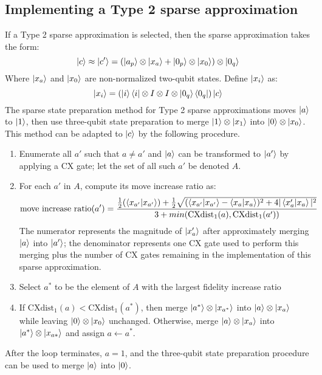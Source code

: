 \documentclass{article}
\begin{document}
\subsection{Implementing a Type 2 sparse approximation}
If a Type 2 sparse approximation is selected, then the sparse approximation
takes the form:
$$\mathinner{|{c}\rangle} \approx \mathinner{|{c'}\rangle} = (\mathinner{|{a_p}\rangle} \otimes \mathinner{|{x_a}\rangle} + 
  \mathinner{|{0_p}\rangle} \otimes \mathinner{|{x_0}\rangle}) \otimes \mathinner{|{0_q}\rangle}$$
Where $\mathinner{|{x_a}\rangle}$ and $\mathinner{|{x_0}\rangle}$ are non-normalized two-qubit states.
Define $\mathinner{|{x_i}\rangle}$ as:
$$\mathinner{|{x_i}\rangle} = (\mathinner{|{i}\rangle}\mathinner{\langle{i}|} \otimes I \otimes I \otimes \mathinner{|{0_q}\rangle}\mathinner{\langle{0_q}|})\mathinner{|{c}\rangle}$$ 
The sparse state preparation method for Type 2 sparse approximations moves 
$\mathinner{|{a}\rangle}$ to $\mathinner{|{1}\rangle}$, then use three-qubit state preparation to merge 
$\mathinner{|{1}\rangle} \otimes \mathinner{|{x_1}\rangle}$ into $\mathinner{|{0}\rangle} \otimes \mathinner{|{x_0}\rangle}$. This method can be
adapted to $\mathinner{|{c}\rangle}$ by the following procedure.
\begin{enumerate}
	\item Enumerate all $a'$ such that $a \neq a'$ and $\mathinner{|{a}\rangle}$ can be 
        transformed to $\mathinner{|{a'}\rangle}$ by applying a CX gate; let the set of all such
        $a'$ be denoted $A$.
	\item For each $a'$ in $A$, compute its move increase ratio as:
		$$\text{move increase ratio}(a') = \frac{\frac{1}{2}(\mathinner{\langle{x_{a'} | x_{a'}}\rangle}) 
        + \frac{1}{2}\sqrt{(\mathinner{\langle{x_{a'}|x_{a'}}\rangle} 
        - \mathinner{\langle{x_a|x_a}\rangle})^2 + 4|\mathinner{\langle{x_a'|x_a}\rangle}|^2}}
        {3 + min(\text{CXdist}_1(a), \text{CXdist}_1(a'))}$$
        The numerator represents the magnitude of $\mathinner{|{x_a'}\rangle}$ after
        approximately merging $\mathinner{|{a}\rangle}$ into $\mathinner{|{a'}\rangle}$; the denominator
        represents one CX gate used to perform this merging plus the number of
        CX gates remaining in the implementation of this sparse approximation.
	\item Select $a^*$ to be the element of $A$ with the largest
		fidelity increase ratio
	\item If $\text{CXdist}_1(a) < \text{CXdist}_1(a^*)$, then merge 
		$\mathinner{|{a^*}\rangle} \otimes \mathinner{|{x_{a^*}}\rangle}$ into $\mathinner{|{a}\rangle} \otimes \mathinner{|{x_a}\rangle}$ while
        leaving $\mathinner{|{0}\rangle} \otimes \mathinner{|{x_0}\rangle}$ unchanged. Otherwise, merge 
        $\mathinner{|{a}\rangle} \otimes \mathinner{|{x_a}\rangle}$ into $\mathinner{|{a^*}\rangle} \otimes \mathinner{|{x_{a*}}\rangle}$
		and assign $a \leftarrow a^*$.
\end{enumerate}
After the loop terminates, $a = 1$, and the three-qubit state preparation
procedure can be used to merge $\mathinner{|{a}\rangle}$ into $\mathinner{|{0}\rangle}$.
\end{document}
